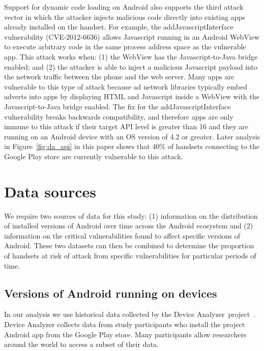 \documentclass[conference,a4paper,twoside]{IEEEtran}
\newcommand{\da}{Device Analyzer}
\begin{document}
Support for dynamic code loading on Android also supports the third attack vector in which the attacker injects malicious code directly into existing apps already installed on the handset. 
For example, the addJavascriptInterface vulnerability (CVE-2012-6636) allows Javascript running in an Android WebView to execute arbitrary code in the same process address space as the vulnerable app.
This attack works when: (1) the WebView has the Javascript-to-Java bridge enabled; and (2) the attacker is able to inject a malicious Javascript payload into the network traffic between the phone and the web server. 
Many apps are vulnerable to this type of attack because ad network libraries typically embed adverts into apps by displaying HTML and Javascript inside a WebView with the Javascript-to-Java bridge enabled. 
The fix for the addJavascriptInterface vulnerability breaks backwards compatibility, and therefore apps are only immune to this attack if their target API level is greater than 16 and they are running on an Android device with an OS version of 4.2 or greater.
Later analysis in Figure~\ref{fig:da_api} in this paper shows that 40\% of handsets connecting to the Google Play store are currently vulnerable to this attack.

\section{Data sources}
\label{sec:background}

We require two sources of data for this study: (1) information on the distribution of installed versions of Android over time across the Android ecosystem and (2) information on the critical vulnerabilities found to affect specific versions of Android.
These two datasets can then be combined to determine the proportion of handsets at risk of attack from specific vulnerabilities for particular periods of time.

\subsection{Versions of Android running on devices}

In our analysis we use historical data collected by the \da\ project~\cite{Wagner2013}.
Device Analyzer collects data from study participants who install the project Android app from the Google Play store.
Many participants allow researchers around the world to access a subset of their data.
\end{document}
